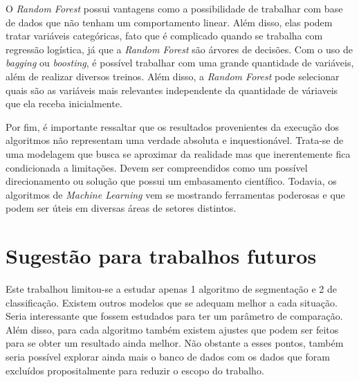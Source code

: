 O \emph{Random Forest} possui vantagens como a possibilidade de trabalhar com base de dados que não tenham um comportamento linear. Além disso, elas podem tratar variáveis categóricas, fato que é complicado quando se trabalha com regressão logística, já que a \emph{Random Forest} são árvores de decisões. Com o uso de \emph{bagging} ou \emph{boosting}, é possível trabalhar com uma grande quantidade de variáveis, além de realizar diversos treinos. Além disso, a \emph{Random Forest} pode selecionar quais são as variáveis mais relevantes independente da quantidade de váriaveis que ela receba inicialmente.

Por fim, é importante ressaltar que os resultados provenientes da execução dos algoritmos não representam uma verdade absoluta e inquestionável. Trata-se de uma modelagem que busca se aproximar da realidade mas que inerentemente fica condicionada a limitações. Devem ser compreendidos como um possível direcionamento ou solução que possui um embasamento científico. Todavia, os algoritmos de \emph{Machine Learning} vem se mostrando ferramentas poderosas e que podem ser úteis em diversas áreas de setores distintos.

\section{Sugestão para trabalhos futuros}
Este trabalhou limitou-se a estudar apenas 1 algoritmo de segmentação e 2 de classificação. Existem outros modelos que se adequam melhor a cada situação. Seria interessante que fossem estudados para ter um parâmetro de comparação.
Além disso, para cada algoritmo também existem ajustes que podem ser feitos para se obter um resultado ainda melhor.
Não obstante a esses pontos, também seria possível explorar ainda mais o banco de dados com os dados que foram excluídos propositalmente para reduzir o escopo do trabalho.



